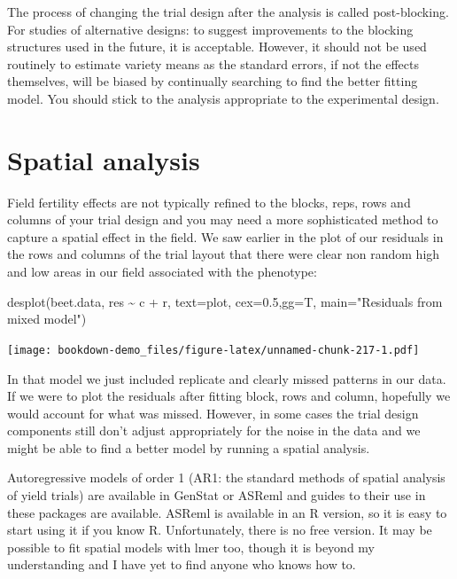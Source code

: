 \documentclass[
]{book}
\newenvironment{Shaded}{\begin{snugshade}}{\end{snugshade}}
\newcommand{\AttributeTok}[1]{\textcolor[rgb]{0.77,0.63,0.00}{#1}}
\newcommand{\FloatTok}[1]{\textcolor[rgb]{0.00,0.00,0.81}{#1}}
\newcommand{\FunctionTok}[1]{\textcolor[rgb]{0.00,0.00,0.00}{#1}}
\newcommand{\NormalTok}[1]{#1}
\newcommand{\SpecialCharTok}[1]{\textcolor[rgb]{0.00,0.00,0.00}{#1}}
\newcommand{\StringTok}[1]{\textcolor[rgb]{0.31,0.60,0.02}{#1}}
\begin{document}
The process of changing the trial design after the analysis is called post-blocking. For studies of alternative designs: to suggest improvements to the blocking structures used in the future, it is acceptable. However, it should not be used routinely to estimate variety means as the standard errors, if not the effects themselves, will be biased by continually searching to find the better fitting model. You should stick to the analysis appropriate to the experimental design.

\hypertarget{spatial-analysis}{%
\section{Spatial analysis}\label{spatial-analysis}}

Field fertility effects are not typically refined to the blocks, reps, rows and columns of your trial design and you may need a more sophisticated method to capture a spatial effect in the field. We saw earlier in the plot of our residuals in the rows and columns of the trial layout that there were clear non random high and low areas in our field associated with the phenotype:

\begin{Shaded}
\begin{Highlighting}[]
\FunctionTok{desplot}\NormalTok{(beet.data, res }\SpecialCharTok{\textasciitilde{}}\NormalTok{ c }\SpecialCharTok{+}\NormalTok{ r, }\AttributeTok{text=}\NormalTok{plot, }\AttributeTok{cex=}\FloatTok{0.5}\NormalTok{,}\AttributeTok{gg=}\NormalTok{T, }\AttributeTok{main=}\StringTok{"Residuals from mixed model"}\NormalTok{)}
\end{Highlighting}
\end{Shaded}

\texttt{[image: bookdown-demo\_files/figure-latex/unnamed-chunk-217-1.pdf]}

In that model we just included replicate and clearly missed patterns in our data. If we were to plot the residuals after fitting block, rows and column, hopefully we would account for what was missed. However, in some cases the trial design components still don't adjust appropriately for the noise in the data and we might be able to find a better model by running a spatial analysis.

Autoregressive models of order 1 (AR1: the standard methods of spatial analysis of yield trials) are available in GenStat or ASReml and guides to their use in these packages are available. ASReml is available in an R version, so it is easy to start using it if you know R. Unfortunately, there is no free version. It may be possible to fit spatial models with lmer too, though it is beyond my understanding and I have yet to find anyone who knows how to.
\end{document}
